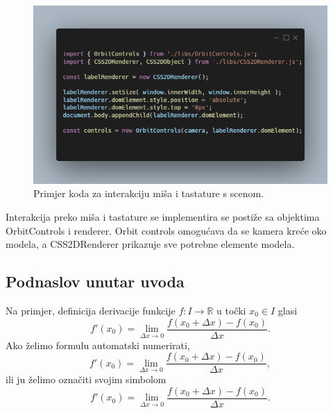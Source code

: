 \documentclass[a4paper,12pt]{article}
\begin{document}
\begin{figure}[ht]
    \centering
    \includegraphics[scale=0.5]{image/zadatak1_kontrole.png}
    \caption{Primjer koda za interakciju miša i tastature s scenom.}
\end{figure}

\pagebreak
Interakcija preko miša i tastature se implementira se postiže sa objektima OrbitControls i renderer. Orbit controls omogućava da se kamera kreće oko modela,
a CSS2DRenderer prikazuje sve potrebne elemente modela.


\subsection{Podnaslov unutar uvoda}
Na primjer, definicija derivacije funkcije $f:I\to\mathbb{R}$ u točki $x_0\in I$ glasi
$$f'(x_0)=\lim_{\Delta x\to 0}{\frac{f(x_0+\Delta x)-f(x_0)}{\Delta x}}.$$
Ako želimo formulu automatski numerirati,
\begin{equation}
f'(x_0)=\lim_{\Delta x\to 0}{\frac{f(x_0+\Delta x)-f(x_0)}{\Delta x}},
\end{equation}
ili ju želimo označiti svojim simbolom
\begin{equation}
f'(x_0)=\lim_{\Delta x\to 0}{\frac{f(x_0+\Delta x)-f(x_0)}{\Delta x}}.\tag{$\clubsuit$}
\end{equation}

\newpage
\end{document}
